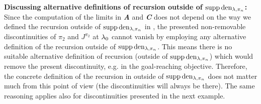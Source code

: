 \textbf{Discussing alternative definitions of \eUDRL{} recursion outside of $\operatorname*{\mathrm{supp}} \mathrm{den}_{\mathit{\lambda},\pi_n}$:} 
Since the computation of the limits in \textit{\textbf{A}} and \textit{\textbf{C}} does not depend
on the way we defined the \eUDRL{} recursion outside of $\operatorname*{\mathrm{supp}} \mathrm{den}_{\mathit{\lambda},\pi_n}$ in ,
the presented non-removable discontinuities of $\pi_2$ and $J^{\pi_2}$
at $\mathit{\lambda}_0$ cannot vanish by employing any alternative definition
of the recursion outside of $\operatorname*{\mathrm{supp}} \mathrm{den}_{\mathit{\lambda},\pi_n}$. This means there is no suitable alternative definition of \eUDRL{} recursion (outside of $\operatorname*{\mathrm{supp}} \mathrm{den}_{\mathit{\lambda},\pi_n}$) which would remove the present discontinuity, e.g. in the goal-reaching objective. Therefore, the concrete
definition of the recursion in  outside of $\operatorname*{\mathrm{supp}} \mathrm{den}_{\mathit{\lambda},\pi_n}$ does not matter much from this point of view (the discontinuities will always be there). The same reasoning applies also for discontinuities presented in the next example.

